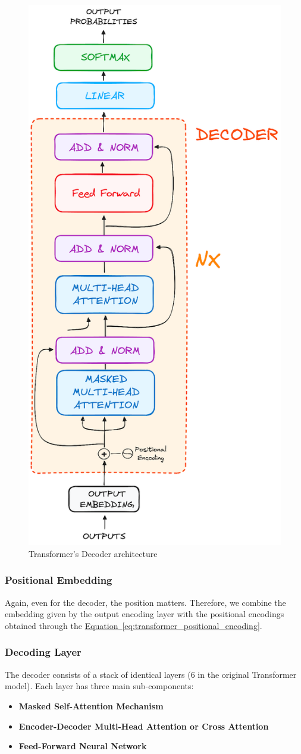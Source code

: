 \documentclass[12pt]{article}
\begin{document}
\begin{figure}
    \centering
    \includegraphics[width=.35\textwidth]{Images/transformer_decoder_architecture.png}
    \caption{Transformer's Decoder architecture}
    \label{fig:transformer_decoder_architecture}
\end{figure}

\subsubsection{Positional Embedding}
Again, even for the decoder, the position matters. Therefore, we combine the embedding given by the output
encoding layer with the positional encodings obtained through the 
\hyperref[eq:transformer_positional_encoding]{Equation~\ref*{eq:transformer_positional_encoding}}.


\subsubsection{Decoding Layer}
The decoder consists of a stack of identical layers (6 in the original Transformer model). Each layer has three 
main sub-components:
\begin{itemize}
    \item \textbf{Masked Self-Attention Mechanism}
    \item \textbf{Encoder-Decoder Multi-Head Attention or Cross Attention}
    \item \textbf{Feed-Forward Neural Network}
\end{itemize}
\end{document}
